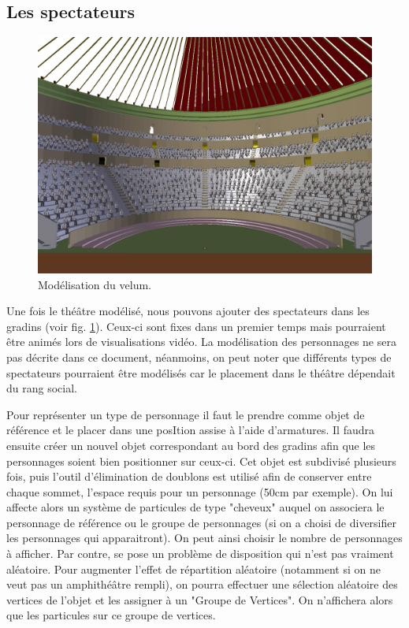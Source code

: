 \subsection{Les spectateurs}

\begin{figure}[!h]
	\centering
	\includegraphics[width=\textwidth]{images/modPublic}
	\caption{Modélisation du \gls{velum}.} 
	\label{modPublic} 
\end{figure}

Une fois le théâtre modélisé, nous pouvons ajouter des spectateurs dans les gradins (voir fig. \ref{modPublic}). Ceux-ci sont fixes dans un premier temps mais pourraient être animés lors de visualisations vidéo. La modélisation des personnages ne sera pas décrite dans ce document, néanmoins, on peut noter que différents types de spectateurs pourraient être modélisés car le placement dans le théâtre dépendait du rang social.

Pour représenter un type de personnage il faut le prendre comme objet de référence et le placer dans une posItion assise à l'aide d'\glspl{armature}. Il faudra ensuite créer un nouvel objet correspondant au bord des gradins afin que les personnages soient bien positionner sur ceux-ci. Cet objet est subdivisé plusieurs fois, puis l'outil d'élimination de doublons est utilisé afin de conserver entre chaque sommet, l'espace requis pour un personnage (50cm par exemple). On lui affecte alors un système de \glspl{particule} de type "cheveux" auquel on associera le personnage de référence ou le groupe de personnages (si on a choisi de diversifier les personnages qui apparaitront). On peut ainsi choisir le nombre de personnages à afficher. Par contre, se pose un problème de disposition qui n'est pas vraiment aléatoire. Pour augmenter l'effet de répartition aléatoire (notamment si on ne veut pas un amphithéâtre rempli), on pourra effectuer une sélection aléatoire des vertices de l'objet et les assigner à un "Groupe de Vertices". On n'affichera alors que les particules sur ce groupe de vertices. 


